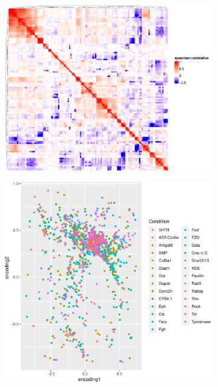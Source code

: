 \documentclass{article}
\begin{document}
\begin{figure}
     \begin{subfigure}[b]{0.6\textwidth}
         \includegraphics[width=\textwidth]{correlation.pdf}
         \caption{}
         \label{fig:}
     \end{subfigure}
     \vspace{1cm}
     \begin{subfigure}[b]{0.5\textwidth}
         \includegraphics[width=\textwidth]{embedding.cond.pdf}

\end{subfigure}
\end{figure}
\end{document}
